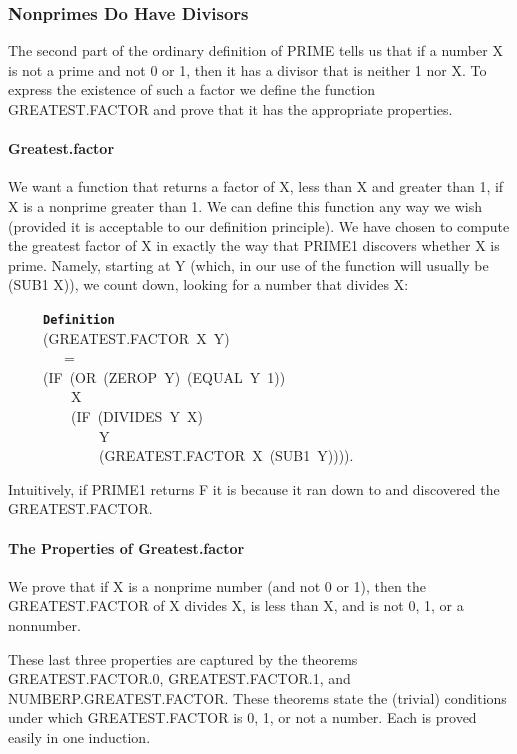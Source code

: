 \documentclass[11pt]{book}
\newenvironment{pubasis}{\begin{flushleft}\ttfamily\small}{\normalsize\rmfamily\end{flushleft}}
\newcommand{\axiomordefinition}[1]{\vspace{6pt}\texttt{\textbf{#1}}}
\newcommand{\pubdefaulttextsize}{\large}
\begin{document}
\subsubsection{Nonprimes Do Have Divisors}
\pubdefaulttextsize
The second part of the ordinary definition of
PRIME tells us that if a number X is not a prime
and not 0 or 1, then it has a divisor that is
neither 1 nor X.  To  express the existence of
such a factor we define     the function        
GREAT\-EST.FAC\-TOR and prove that it has the appropriate properties.
\paragraph{Greatest.factor}
\pubdefaulttextsize
We want a function that returns a factor of X, less than X and
greater than 1,   if X is a nonprime
greater than 1.  We can define this function any way we wish
(provided it is acceptable to our definition principle).
We have chosen to compute the greatest factor of X in exactly
the way that PRIME1 discovers whether X is prime.  Namely, starting
at Y (which, in our use of the function will usually
be (SUB1 X)), we  count down, looking for a number that divides X:
\begin{pubasis}
~~~~~\axiomordefinition{Definition}\\
~~~~~(GREAT\-EST.FAC\-TOR~X~Y)\\
~~~~~~~~=\\
~~~~~(IF~(OR~(ZEROP~Y)~(EQUAL~Y~1))\\
~~~~~~~~~X\\
~~~~~~~~~(IF~(DIVIDES~Y~X)\\
~~~~~~~~~~~~~Y\\
~~~~~~~~~~~~~(GREAT\-EST.FAC\-TOR~X~(SUB1~Y)))).\\
\end{pubasis}
Intuitively, if PRIME1 returns F it
is because it ran down to and discovered
the GREAT\-EST.FAC\-TOR.  
\paragraph{The Properties of Greatest.factor}
\pubdefaulttextsize
We prove that if X is a nonprime number (and not 0 or 1), then the GREAT\-EST.FAC\-TOR of X divides X, is less than X,
and is not 0, 1, or a nonnumber.

These last three properties are captured by
the theorems GREAT\-EST.FAC\-TOR.0, GREAT\-EST.FAC\-TOR.1, and NUMBERP.GREAT\-EST.FAC\-TOR.
These theorems state the (trivial) conditions under which GREAT\-EST.FAC\-TOR
is 0, 1, or not a number.  Each is proved easily in one induction.
\end{document}
